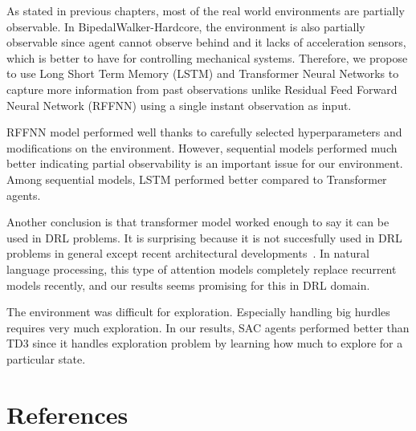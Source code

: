 \documentclass[a4paper, 12pt]{article} %
\begin{document}
As stated in previous chapters, most of the real world environments are partially observable. 
In BipedalWalker-Hardcore, the environment is also partially observable since agent cannot observe behind and it lacks of acceleration sensors, which is better to have for controlling mechanical systems. 
Therefore, we propose to use Long Short Term Memory (LSTM) and Transformer Neural Networks to capture more information from past observations unlike Residual Feed Forward Neural Network (RFFNN) using a single instant observation as input. 

RFFNN model performed well thanks to carefully selected hyperparameters and modifications on the environment. 
However, sequential models performed much better indicating partial observability is an important issue for our environment. 
Among sequential models, LSTM performed better compared to Transformer agents. 

Another conclusion is that transformer model worked enough to say it can be used in DRL problems. 
It is surprising because it is not succesfully used in DRL problems in general except recent architectural developments~\cite{parisotto_stabilizing_2019}. 
In natural language processing, this type of attention models completely replace recurrent models recently, and our results seems promising for this in DRL domain. 

The environment was difficult for exploration. 
Especially handling big hurdles requires very much exploration.
In our results, SAC agents performed better than TD3 since it handles exploration problem by learning how much to explore for a particular state. 

\section{References}




%
\end{document}
